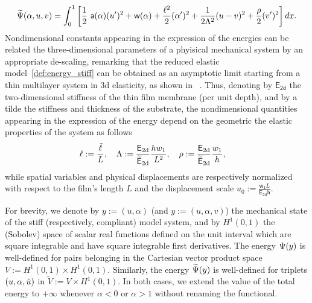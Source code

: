 \documentclass[10pt]{article}
\begin{document}
\begin{equation}
    \label{def:energy_compliant}
    \Ecompl(\alpha, u,  v) = \int_{0}^1 \left[ \frac{1}{2} \ \soften(\alpha)(u')^2 + \homogdiss(\alpha) + \frac{\damagell^2}{2}(\alpha')^2 
    + \frac{1}{2 \elastell^2} (u- v)^2 
    + \frac{\stiffratio}{2}  (v')^2 \right] dx.
\end{equation}
%
%
%
%
Nondimensional constants appearing in the expression of the energies can be related the three-dimensional parameters of a phyisical mechanical system by an appropriate de-scaling, remarking that the reduced elastic model~\eqref{def:energy_stiff} can be obtained as an asymptotic limit starting from a thin multilayer system in 3d elasticity, as shown in~\cite{Leon_Baldelli2015-rp} .
%
Thus, denoting by $\mathsf{E_\text{2d}}$ the two-dimensional stiffness of the thin film membrane (per unit depth), and by a tilde the stiffness and thickness of the substrate, the nondimensional quantities appearing in the expression of the energy depend on the geometric the elastic properties of the system as follows
\begin{equation}
    \label{def:dimensional_parameters}
    \ell := \frac{\bar{\ell}}{L}, \quad
    \Lambda := \frac{\mathsf{E_{\text{2d}}}}{{\mathsf{\widetilde E_{\text{2d}}}}}\frac{h w_1}{L^2}, \quad
    \rho := \frac{\mathsf{E_{\text{2d}}}}{{\mathsf{\widetilde E_{\text{2d}}}}}\frac{w_1}{h}, \quad
\end{equation}
while spatial variables and physical displacements are respectively normalized with respect to the film's length $L$ and the displacement scale $u_0 := \frac{\mathsf{w_1}L}{\mathsf{E_{\text{2d}} h}}$.




%

For brevity, we denote by $y:=(u, \alpha)$ (and $y:=(u, \alpha, v)$) the mechanical state of the stiff (respectively, compliant) model system, and by $H^1(0, 1)$ the (Sobolev) space of scalar real functions defined on the unit interval which are square integrable and have square integrable first derivatives. The energy $\Psi(y)$ is well-defined for pairs belonging in the Cartesian vector product space $V:=H^1(0,1)\times  H^1(0,1)$. Similarly, the energy $\widetilde\Psi(y)$ is well-defined for triplets $(u, \alpha, \tilde u)$ in $\widetilde V:=V\times  H^1(0,1)$. In both cases, we extend the value of the total energy to $+\infty$ whenever $\alpha < 0$ or $\alpha > 1$ without renaming the functional.
%

%
%

%


%
\end{document}

